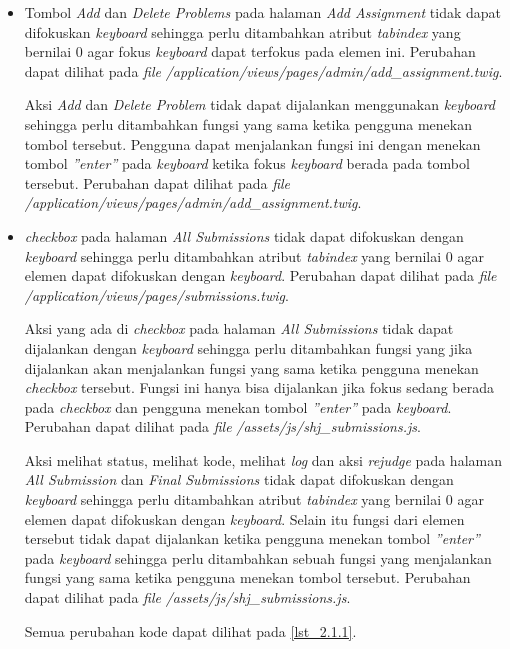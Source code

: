 \begin{itemize}
	\item Tombol \textit{Add} dan \textit{Delete Problems} pada halaman \textit{Add Assignment} tidak dapat difokuskan \textit{keyboard} sehingga perlu ditambahkan atribut \textit{tabindex} yang bernilai 0 agar fokus \textit{keyboard} dapat terfokus pada elemen ini. Perubahan dapat dilihat pada \textit{file} \textit{/application/views/pages/admin/add\_assignment.twig}.

	Aksi \textit{Add} dan \textit{Delete Problem} tidak dapat dijalankan menggunakan \textit{keyboard} sehingga perlu ditambahkan fungsi yang sama ketika pengguna menekan tombol tersebut. Pengguna dapat menjalankan fungsi ini dengan menekan tombol \textit{''enter''} pada \textit{keyboard} ketika fokus \textit{keyboard} berada pada tombol tersebut. Perubahan dapat dilihat pada \textit{file} \textit{/application/views/pages/admin/add\_assignment.twig}.

	\item \textit{checkbox} pada halaman \textit{All Submissions} tidak dapat difokuskan dengan \textit{keyboard} sehingga perlu ditambahkan atribut \textit{tabindex} yang bernilai 0 agar elemen dapat difokuskan dengan \textit{keyboard}. Perubahan dapat dilihat pada \textit{file} \textit{/application/views/pages/submissions.twig}.
	
	Aksi yang ada di \textit{checkbox} pada halaman \textit{All Submissions} tidak dapat dijalankan dengan \textit{keyboard} sehingga perlu ditambahkan fungsi yang jika dijalankan akan menjalankan fungsi yang sama ketika pengguna menekan \textit{checkbox} tersebut. Fungsi ini hanya bisa dijalankan jika fokus sedang berada pada \textit{checkbox} dan pengguna menekan tombol \textit{''enter''} pada \textit{keyboard}. Perubahan dapat dilihat pada \textit{file} \textit{/assets/js/shj\_submissions.js}.
	
	Aksi melihat status, melihat kode, melihat \textit{log} dan aksi \textit{rejudge} pada halaman \textit{All Submission} dan \textit{Final Submissions} tidak dapat difokuskan dengan \textit{keyboard} sehingga perlu ditambahkan atribut \textit{tabindex} yang bernilai 0 agar elemen dapat difokuskan dengan \textit{keyboard}. Selain itu fungsi dari elemen tersebut tidak dapat dijalankan ketika pengguna menekan tombol \textit{''enter''} pada \textit{keyboard} sehingga perlu ditambahkan sebuah fungsi yang menjalankan fungsi yang sama ketika pengguna menekan tombol tersebut. Perubahan dapat dilihat pada \textit{file} \textit{/assets/js/shj\_submissions.js}.
	
	Semua perubahan kode dapat dilihat pada \ref{lst_2.1.1}.


\end{itemize}
